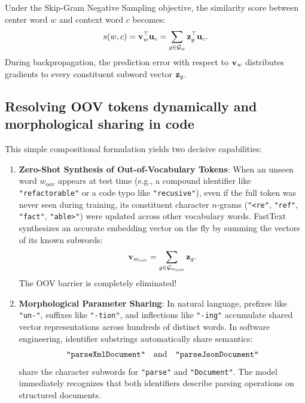 \documentclass[../../main.tex]{subfiles}
\begin{document}
Under the Skip-Gram Negative Sampling objective, the similarity score between center word $w$ and context word $c$ becomes:
\begin{equation}
\label{eq:fasttext_scoring}
s(w, c) = \mathbf{v}_w^\top \mathbf{u}_c = \sum_{g \in \mathcal{G}_w} \mathbf{z}_g^\top \mathbf{u}_c.
\end{equation}
During backpropagation, the prediction error with respect to $\mathbf{v}_w$ distributes gradients to every constituent subword vector $\mathbf{z}_g$.

\subsection{Resolving OOV tokens dynamically and morphological sharing in code}
\label{subsec:fasttext_oov_resolution}

This simple compositional formulation yields two decisive capabilities:

\begin{enumerate}
    \item \textbf{Zero-Shot Synthesis of Out-of-Vocabulary Tokens}:
    When an unseen word $w_{\text{oov}}$ appears at test time (e.g., a compound identifier like \texttt{"refactorable"} or a code typo like \texttt{"recusive"}), even if the full token was never seen during training, its constituent character $n$-grams (\texttt{"<re"}, \texttt{"ref"}, \texttt{"fact"}, \texttt{"able>"}) were updated across other vocabulary words.
    FastText synthesizes an accurate embedding vector on the fly by summing the vectors of its known subwords:
    \begin{equation}
    \label{eq:fasttext_oov_synth}
    \mathbf{v}_{w_{\text{oov}}} = \sum_{g \in \mathcal{G}_{w_{\text{oov}}}} \mathbf{z}_g.
    \end{equation}
    The OOV barrier is completely eliminated!
    
    \item \textbf{Morphological Parameter Sharing}:
    In natural language, prefixes like \texttt{"un-"}, suffixes like \texttt{"-tion"}, and inflections like \texttt{"-ing"} accumulate shared vector representations across hundreds of distinct words.
    In software engineering, identifier substrings automatically share semantics:
    \begin{equation}
    \label{eq:code_subword_sharing}
    \text{\texttt{"parseXmlDocument"}} \quad \text{and} \quad \text{\texttt{"parseJsonDocument"}}
    \end{equation}
    share the character subwords for \texttt{"parse"} and \texttt{"Document"}. The model immediately recognizes that both identifiers describe parsing operations on structured documents.
\end{enumerate}
\end{document}
